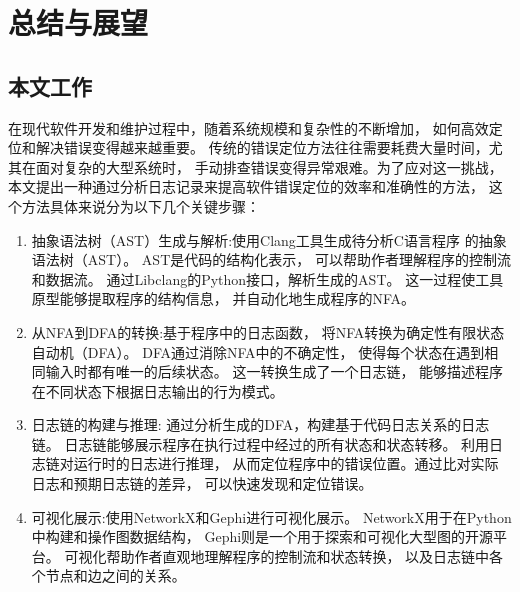 \chapter{总结与展望}
\section{本文工作}
在现代软件开发和维护过程中，随着系统规模和复杂性的不断增加，
如何高效定位和解决错误变得越来越重要。
传统的错误定位方法往往需要耗费大量时间，尤其在面对复杂的大型系统时，
手动排查错误变得异常艰难。为了应对这一挑战，
本文提出一种通过分析日志记录来提高软件错误定位的效率和准确性的方法，
这个方法具体来说分为以下几个关键步骤：
\begin{enumerate}
    \item 抽象语法树（AST）生成与解析:使用Clang工具生成待分析C语言程序
        的抽象语法树（AST）。
        AST是代码的结构化表示，
        可以帮助作者理解程序的控制流和数据流。
        通过Libclang的Python接口，解析生成的AST。
        这一过程使工具原型能够提取程序的结构信息，
        并自动化地生成程序的NFA。

    \item 从NFA到DFA的转换:基于程序中的日志函数，
        将NFA转换为确定性有限状态自动机（DFA）。
        DFA通过消除NFA中的不确定性，
        使得每个状态在遇到相同输入时都有唯一的后续状态。
        这一转换生成了一个日志链，
        能够描述程序在不同状态下根据日志输出的行为模式。
    \item 日志链的构建与推理:
            通过分析生成的DFA，构建基于代码日志关系的日志链。
            日志链能够展示程序在执行过程中经过的所有状态和状态转移。
            利用日志链对运行时的日志进行推理，
            从而定位程序中的错误位置。通过比对实际日志和预期日志链的差异，
            可以快速发现和定位错误。

    \item 可视化展示:使用NetworkX和Gephi进行可视化展示。
    NetworkX用于在Python中构建和操作图数据结构，
    Gephi则是一个用于探索和可视化大型图的开源平台。
    可视化帮助作者直观地理解程序的控制流和状态转换，
    以及日志链中各个节点和边之间的关系。
\end{enumerate}


